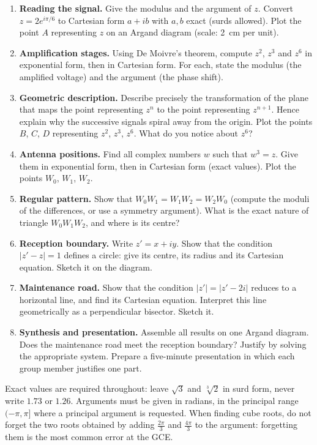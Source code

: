\documentclass[11pt]{article}
\begin{document}
\begin{enumerate}
\item \textbf{Reading the signal.} Give the modulus and the argument of $z$. Convert $z = 2e^{i\pi/6}$ to Cartesian form $a + ib$ with $a, b$ exact (surds allowed). Plot the point $A$ representing $z$ on an Argand diagram (scale: \SI{2}{cm} per unit).
\item \textbf{Amplification stages.} Using De Moivre's theorem, compute $z^{2}$, $z^{3}$ and $z^{6}$ in exponential form, then in Cartesian form. For each, state the modulus (the amplified voltage) and the argument (the phase shift).
\item \textbf{Geometric description.} Describe precisely the transformation of the plane that maps the point representing $z^{n}$ to the point representing $z^{n+1}$. Hence explain why the successive signals spiral away from the origin. Plot the points $B$, $C$, $D$ representing $z^{2}$, $z^{3}$, $z^{6}$. What do you notice about $z^{6}$?
\item \textbf{Antenna positions.} Find all complex numbers $w$ such that $w^{3} = z$. Give them in exponential form, then in Cartesian form (exact values). Plot the points $W_{0}$, $W_{1}$, $W_{2}$.
\item \textbf{Regular pattern.} Show that $W_{0}W_{1} = W_{1}W_{2} = W_{2}W_{0}$ (compute the moduli of the differences, or use a symmetry argument). What is the exact nature of triangle $W_{0}W_{1}W_{2}$, and where is its centre?
\item \textbf{Reception boundary.} Write $z' = x + iy$. Show that the condition $|z' - z| = 1$ defines a circle: give its centre, its radius and its Cartesian equation. Sketch it on the diagram.
\item \textbf{Maintenance road.} Show that the condition $|z'| = |z' - 2i|$ reduces to a horizontal line, and find its Cartesian equation. Interpret this line geometrically as a perpendicular bisector. Sketch it.
\item \textbf{Synthesis and presentation.} Assemble all results on one Argand diagram. Does the maintenance road meet the reception boundary? Justify by solving the appropriate system. Prepare a five-minute presentation in which each group member justifies one part.
\end{enumerate}

\begin{attention}
Exact values are required throughout: leave $\sqrt{3}$ and $\sqrt[3]{2}$ in surd form, never write $1.73$ or $1.26$. Arguments must be given in radians, in the principal range $(-\pi, \pi]$ where a principal argument is requested. When finding cube roots, do not forget the two roots obtained by adding $\frac{2\pi}{3}$ and $\frac{4\pi}{3}$ to the argument: forgetting them is the most common error at the GCE.
\end{attention}
\end{document}
